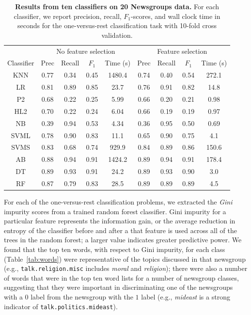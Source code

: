 \documentclass{article} %
\begin{document}
\begin{table}[htbp]
\small
   \centering
   \begin{tabular}{@{}|c|c|c|c|c|c|c|c|c|@{}} %
   \hline
    &  \multicolumn{4}{c}{No feature selection} &
  \multicolumn{4}{c|}{Feature selection}  \\
  \cline{2-9}
   Classifier & Prec & Recall & $F_1$ & Time (s)& Prec & Recall & $F_1$ & Time (s) \\ \hline \hline
      KNN   &  0.77 & 0.34 & 0.45 & 1480.4 & 0.74 & 0.40 & 0.54 & 272.1\\
        LR   &  0.81 & 0.89 & 0.85 & 23.7& 0.76 & 0.91 & 0.82 & 14.8 \\
      P2      &  0.68 & 0.22 & 0.25 & 5.99& 0.66 & 0.20 & 0.21 & 0.98\\
      HL2    &  0.70 & 0.22 & 0.24 & 6.04& 0.66 & 0.19 & 0.19 & 0.97 \\
      NB &  0.39 & 0.94 & 0.53 & 4.34& 0.36 & 0.95 & 0.50 & 0.69  \\
      SVML &  0.78 & 0.90 & 0.83 & 11.1 & 0.65 & 0.90 & 0.75 & 4.1 \\
      SVMS &  0.83 & 0.68 & 0.74 & 929.9& 0.84 & 0.89 & 0.86 & 150.6 \\
      AB & 0.88 & 0.94 & 0.91 & 1424.2& 0.89 & 0.94 & 0.91 & 178.4 \\
      DT & 0.89 & 0.93 & 0.91 & 24.2& 0.89 & 0.93 & 0.90 & 3.0 \\
      RF &  0.87 & 0.79 & 0.83 & 28.5& 0.89 & 0.89 & 0.89 & 4.5 \\ \hline
   \end{tabular}
   \caption{{\bf Results from ten classifiers on 20 Newsgroups data.} For each classifier, we report precision, recall,  $F_1$-scores, and wall clock time in seconds for the one-versus-rest classification task with 10-fold cross validation.}
   \label{tab:classifiers}
\end{table}

For each of the one-versus-rest classification problems, we extracted the \emph{Gini} impurity scores from a trained random forest classifier. Gini impurity for a particular feature represents the information gain, or the average reduction in entropy of the classifier before and after a that feature is used across all of the trees in the random forest; a larger value indicates greater predictive power. We found that the top ten words, with respect to Gini impurity, for each class (Table~\ref{tab:words}) were representative of the topics discussed in that newsgroup (e.g., {\tt talk.religion.misc} includes \emph{moral} and \emph{religion}); there were also a number of words that were in the top ten word lists for a number of newsgroup classes, suggesting that they were important in discriminating one of the newsgroups with a $0$ label from the newsgroup with the $1$ label (e.g., \emph{mideast} is a strong indicator of {\tt talk.politics.mideast}).
\end{document}
